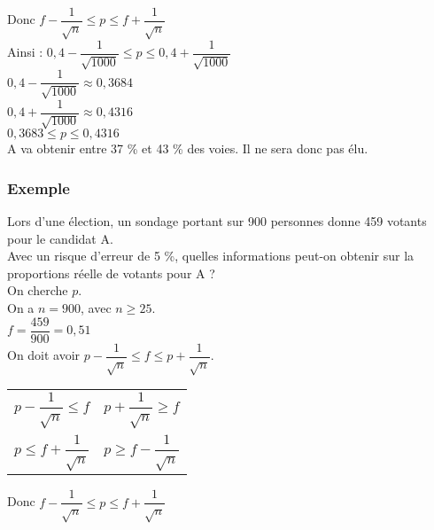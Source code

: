 \vspace{.3cm}

Donc $ f - \dfrac{1}{\sqrt{n}} \leq p \leq f + \dfrac{1}{\sqrt{n}} $ \\

Ainsi : $ 0,4 - \dfrac{1}{\sqrt{1000}} \leq p \leq 0,4 + \dfrac{1}{\sqrt{1000}} $ \\

$ 0,4 - \dfrac{1}{\sqrt{1000}} \approx 0,3684 $ \\

$ 0,4 + \dfrac{1}{\sqrt{1000}} \approx 0,4316 $ \\

$ 0,3683 \leq p \leq 0,4316 $ \\

A va obtenir entre 37  \% et 43  \% des voies. Il ne sera donc pas élu.

\newpage 

\subsubsection{Exemple }

Lors d'une élection, un sondage portant sur 900 personnes donne 459 votants pour le candidat A. \\ Avec un risque d'erreur de 5  \%, quelles informations peut-on obtenir sur la proportions réelle de votants pour A ? \\

On cherche $p$. \\

On a $n = 900 $, avec $ n \geq 25 $. \\

$ f = \dfrac{459}{900} = 0,51 $ \\

On doit avoir $ p - \dfrac{1}{\sqrt{n}} \leq f \leq p + \dfrac{1}{\sqrt{n}} $.

\vspace*{.3cm}

\begin{tabular}{ll}
$ p - \dfrac{1}{\sqrt{n}} \leq f $ & $ p + \dfrac{1}{\sqrt{n}} \geq f $ \\
$ p \leq f + \dfrac{1}{\sqrt{n}}$ & $ p \geq f - \dfrac{1}{\sqrt{n}}$ \\
\end{tabular}

\vspace{.3cm}

Donc $ f - \dfrac{1}{\sqrt{n}} \leq p \leq f + \dfrac{1}{\sqrt{n}} $ \\

